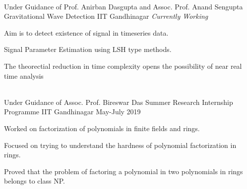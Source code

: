 \\
\cventry
{Under Guidance of Prof. Anirban Dasgupta and Assoc. Prof. Anand Sengupta} %
{Gravitational Wave Detection} %
{IIT Gandhinagar} %
{\textit{Currently Working}} %
{
	\vspace*{-2.0mm}
	\begin{cvitems}
		\item Aim is to detect existence of signal in timeseries data.
		\item Signal Parameter Estimation using LSH type methods.
		\item The theorectial reduction in time complexity opens the possibility of near real time analysis
	\end{cvitems}
}
\\
\cventry
{Under Guidance of Assoc. Prof. Bireswar Das} %
{Summer Research Internship Programme} %
{IIT Gandhinagar} %
{May-July 2019} %
{
	\vspace*{-2.0mm}
	\begin{cvitems}
	\item Worked on factorization of polynomials in finite fields and rings.
	\item Focused on trying to understand the hardness of polynomial factorization in rings.
	\item Proved that the problem of factoring a polynomial in two polynomials in rings belongs to class NP.
	\end{cvitems}	
}